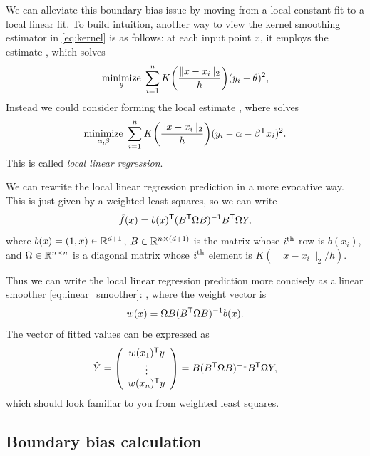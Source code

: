 \documentclass{article}
\begin{document}
We can alleviate this boundary bias issue by moving from a local constant fit to
a local linear fit. To build intuition, another way to view the kernel smoothing
estimator in \eqref{eq:kernel} is as follows: at each input point $x$, it
employs the estimate , which solves 
\[
\mathop{\mathrm{minimize}}_\theta \; \sum_{i=1}^n K\bigg( \frac{\|x-x_i\|_2}{h} \bigg)
(y_i - \theta)^2, 
\]
Instead we could consider forming the local estimate , where  solves
\begin{equation}
\label{eq:llr}
\mathop{\mathrm{minimize}}_{\alpha, \beta} \; \sum_{i=1}^n K\bigg( \frac{\|x-x_i\|_2}{h} \bigg) 
(y_i - \alpha - \beta^{\mathsf{T}} x_i)^2. 
\end{equation}
This is called \emph{local linear regression}.

We can rewrite the local linear regression prediction  in a more 
evocative way. This is just given by a weighted least squares, so we can write 
\[
\hat{f}(x) = b(x)^{\mathsf{T}} (B^{\mathsf{T}} \Omega B)^{-1} B^{\mathsf{T}} \Omega Y,
\]
where $b(x) = (1,x) \in \mathbb{R}^{d+1}$, $B \in \mathbb{R}^{n \times (d+1)}$ is the matrix
whose $i^{\text{th}}$ row is $b(x_i)$, and $\Omega \in \mathbb{R}^{n \times n}$ is a diagonal 
matrix whose $i^{\text{th}}$ element is $K(\|x-x_i\|_2/h)$. 

Thus we can write the local linear regression prediction more concisely as a
linear smoother \eqref{eq:linear_smoother}: , where
the weight vector is
\[
w(x) = \Omega B (B^{\mathsf{T}} \Omega B)^{-1} b(x).
\]
The vector of fitted values  can
be expressed as  
\[
\hat{Y} = 
\left(\begin{array}{c} 
w(x_1)^{\mathsf{T}} y \\ \vdots \\ w(x_n)^{\mathsf{T}} y
\end{array}\right)
= B (B^{\mathsf{T}} \Omega B)^{-1} B^{\mathsf{T}} \Omega Y,
\]
which should look familiar to you from weighted least squares.

\subsection{Boundary bias calculation}
\end{document}
